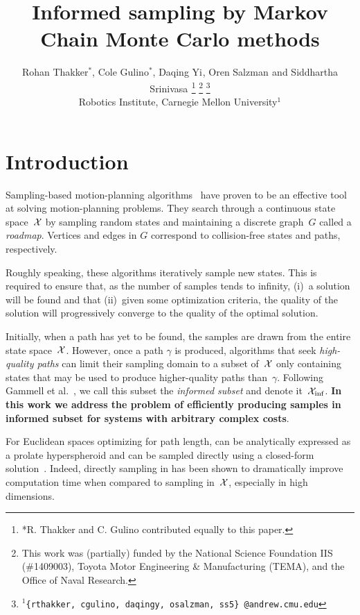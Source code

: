 \documentclass[letterpaper, 10 pt, conference]{ieeeconf}  %
\title{\LARGE \bf
Informed sampling by Markov Chain Monte Carlo methods
}
\author{
Rohan Thakker$^{*}$,
Cole Gulino$^{*}$,
Daqing Yi$^{}$,
Oren Salzman$^{}$ and
Siddhartha Srinivasa$^{}$%
\thanks{*R. Thakker and C. Gulino contributed equally to this paper.}
\thanks{This work was (partially) funded by the National Science Foundation IIS (\#1409003), Toyota Motor Engineering \& Manufacturing (TEMA), and the Office of Naval Research.}%
\thanks{$^{1}${\tt\small \{rthakker, cgulino, daqingy, osalzman, ss5\} @andrew.cmu.edu}}%
%
\\        
Robotics Institute, Carnegie Mellon University$^{1}$
}
\begin{document}
\maketitle
\thispagestyle{empty}
\pagestyle{empty}


\begin{abstract}

\end{abstract}


\section{Introduction}
\label{sec:intro}


Sampling-based motion-planning algorithms~\cite{CBHKKLT05, L06} have proven to be an effective tool at solving motion-planning problems.
They search through a continuous state space~$\mathcal{X}$ by sampling random states and maintaining a discrete graph~$G$ called a \emph{roadmap}.
Vertices and edges in $G$ correspond to collision-free states and paths, respectively.

Roughly speaking, these algorithms iteratively sample new states.
This is required to ensure that, as the number of samples tends to infinity, 
(i)~a solution will be found 
and that
(ii)~given some optimization criteria, the quality of the solution will progressively converge to the quality of the optimal solution.

Initially, 
when a path has yet to be found, 
the samples are drawn from the entire state space~$\mathcal{X}$.
However, once a path $\gamma$ is produced,  algorithms that seek \emph{high-quality paths} can limit their sampling domain to a subset of~$\mathcal{X}$ only  containing states that may be used to produce higher-quality paths than~$\gamma$.
Following Gammell et al.~\cite{GSB14}, we call this subset the \emph{informed subset} and denote it~$\mathcal{X}_{\rm {inf}}$.
\textbf{In this work we address the problem of efficiently producing samples in informed subset for systems with arbitrary complex costs}. 

For Euclidean spaces optimizing for path length, 
\Cinf can be analytically expressed as a prolate hyperspheroid and can be sampled directly using a closed-form solution~\cite{GSB14}.
Indeed, directly sampling in \Cinf has been shown to dramatically improve computation time when compared to sampling in~$\mathcal{X}$, especially in high dimensions. 
\end{document}
